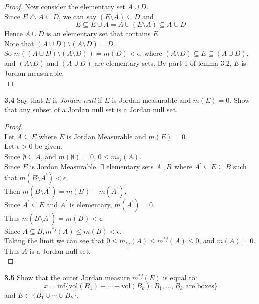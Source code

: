 \documentclass[12pt]{article}
\begin{document}
\begin{proof}
		Now consider the elementary set $A \cup D$. \\
		Since $E \bigtriangleup A \subseteq D$, we can say $(E \setminus A) \subseteq D$ and 
		$$E \subseteq E \cup A = A \cup (E \setminus A) \subseteq A \cup D$$
		Hence $A \cup D$ is an elementary set that contains $E$. \\
		
		Note that $(A \cup D) \setminus (A \setminus D) = D$.\\
		So $m((A \cup D) \setminus (A \setminus D)) = m(D) < \epsilon$, where $(A \setminus D) \subseteq E \subseteq (A \cup D)$, and $(A \setminus D)$ and $(A \cup D)$ are elementary sets. By part 1 of lemma 3.2, $E$ is Jordan measurable. \\		
	\end{proof}

\hspace{-4 ex}\textbf{3.4} Say that $E$ is \emph{Jordan null} if $E$ is Jordan measurable and $m(E)=0$. Show that any subset of a Jordan null set is a Jordan null set. \bigbreak

	\begin{proof}\text{ }\\
		Let $A \subseteq E$ where $E$ is Jordan Measurable and $m(E)=0$. \\
		Let $\epsilon >0$ be given.\\
		Since $\emptyset \subseteq A$, and $m(\emptyset)=0$,  $0 \leq m_{*j}(A)$.\\
		Since $E$ is Jordon Measurable, $\exists$ elementary sets $A^{\prime}, B$ where $A^{\prime} \subseteq E \subseteq B$ such that $m(B \setminus A^{\prime})<\epsilon$. \\
		Then $m(B \setminus A^{\prime}) = m(B) - m(A^{\prime})$. \\
		Since $A^{\prime} \subseteq E$ and $A^\prime$ is elementary, $m(A^{\prime}) = 0$. \\
		Thus $m(B \setminus A^{\prime}) = m(B) < \epsilon$. \\
		Since $A \subseteq B, m^{*j}(A) \leq m(B) < \epsilon$. \\
		Taking the limit we can see that $0 \leq m_{*j}(A) \leq m^{*j}(A) \leq 0$, and $m(A)=0$.\\
		Thus $A$ is a Jordan null set.\\	
	\end{proof}



\hspace{-4 ex}\textbf{3.5} Show that the outer Jordan measure $m^{*j}(E)$ is equal to: $$x = \text{inf}\{\text{vol}(B_1)+\cdots+\text{vol}(B_k) : B_1,\ldots,B_k  \text{ are boxes} \}$$ and $E\subset \{B_1\cup\cdots\cup B_k\}$. \bigbreak
\end{document}
